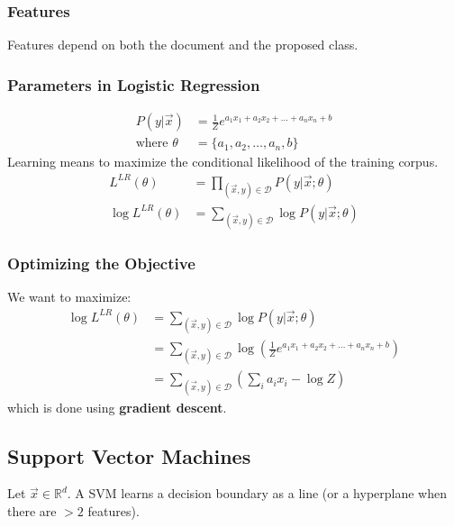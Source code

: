\documentclass{article}
\begin{document}
\subsubsection{Features}
Features depend on both the document and the proposed class.
\subsubsection{Parameters in Logistic Regression}
\begin{align}
    P(y|\vec{x}) &= \frac{1}{Z}e^{a_1x_1 + a_2x_2 + \ldots + a_nx_n + b}\\
    \text{where } \theta &= \{a_1,a_2, \ldots, a_n, b\}
\end{align}
Learning means to maximize the conditional likelihood of the training corpus.
\begin{align}
    L^{LR}(\theta) &= \prod_{(\vec{x},y) \in \mathcal{D}}P(y|\vec{x}; \theta)\\
    \log L^{LR}(\theta) &= \sum_{(\vec{x},y) \in \mathcal{D}}\log P(y|\vec{x}; \theta)
\end{align}
\subsubsection{Optimizing the Objective}
We want to maximize:
\begin{align}
    \log L^{LR}(\theta) &= \sum_{(\vec{x},y) \in \mathcal{D}}\log P(y|\vec{x}; \theta)\\
    &= \sum_{(\vec{x},y) \in \mathcal{D}}\log \left(\frac{1}{Z}e^{a_1x_1 + a_2x_2 + \ldots + a_nx_n + b}\right)\\
    &= \sum_{(\vec{x},y) \in \mathcal{D}}\left(\sum_i a_ix_i - \log Z\right)
\end{align}
which is done using \textbf{gradient descent}.
\subsection{Support Vector Machines}
Let $\vec{x} \in \mathbb{R}^d$. A SVM learns a decision boundary as a line (or a hyperplane when there are $>2$ features).
\end{document}
